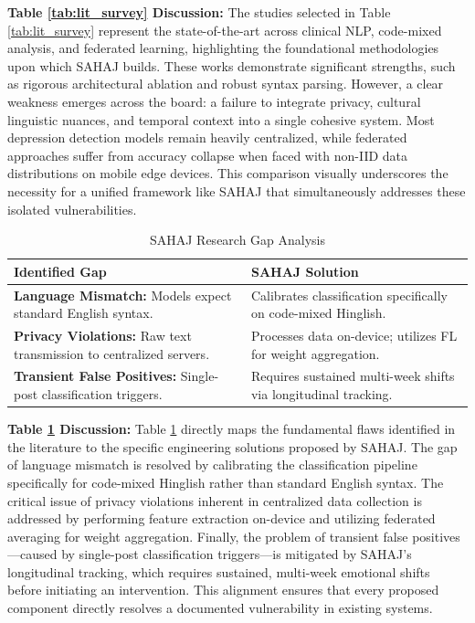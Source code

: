 \documentclass[conference]{IEEEtran}
\begin{document}
\textbf{Table \ref{tab:lit_survey} Discussion:} The studies selected in Table \ref{tab:lit_survey} represent the state-of-the-art across clinical NLP, code-mixed analysis, and federated learning, highlighting the foundational methodologies upon which SAHAJ builds. These works demonstrate significant strengths, such as rigorous architectural ablation and robust syntax parsing. However, a clear weakness emerges across the board: a failure to integrate privacy, cultural linguistic nuances, and temporal context into a single cohesive system. Most depression detection models remain heavily centralized, while federated approaches suffer from accuracy collapse when faced with non-IID data distributions on mobile edge devices. This comparison visually underscores the necessity for a unified framework like SAHAJ that simultaneously addresses these isolated vulnerabilities.

\begin{table}[h]
\caption{SAHAJ Research Gap Analysis}
\label{tab:gap_analysis}
\begin{center}
\begin{tabularx}{\columnwidth}{X X}
\toprule
\textbf{Identified Gap} & \textbf{SAHAJ Solution} \\
\midrule
\textbf{Language Mismatch:} Models expect standard English syntax. & Calibrates classification specifically on code-mixed Hinglish. \\
\textbf{Privacy Violations:} Raw text transmission to centralized servers. & Processes data on-device; utilizes FL for weight aggregation. \\
\textbf{Transient False Positives:} Single-post classification triggers. & Requires sustained multi-week shifts via longitudinal tracking. \\
\bottomrule
\end{tabularx}
\end{center}
\end{table}

\textbf{Table \ref{tab:gap_analysis} Discussion:} Table \ref{tab:gap_analysis} directly maps the fundamental flaws identified in the literature to the specific engineering solutions proposed by SAHAJ. The gap of language mismatch is resolved by calibrating the classification pipeline specifically for code-mixed Hinglish rather than standard English syntax. The critical issue of privacy violations inherent in centralized data collection is addressed by performing feature extraction on-device and utilizing federated averaging for weight aggregation. Finally, the problem of transient false positives---caused by single-post classification triggers---is mitigated by SAHAJ's longitudinal tracking, which requires sustained, multi-week emotional shifts before initiating an intervention. This alignment ensures that every proposed component directly resolves a documented vulnerability in existing systems.
\end{document}
